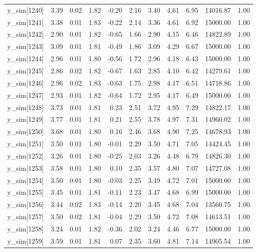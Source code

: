\begin{table}[ht]
\begin{tabular}{rrrrrrrrrrr}
  y\_sim[1240] & 3.39 & 0.02 & 1.82 & -0.20 & 2.16 & 3.40 & 4.61 & 6.95 & 14016.87 & 1.00 \\ 
  y\_sim[1241] & 3.38 & 0.01 & 1.83 & -0.22 & 2.14 & 3.36 & 4.61 & 6.92 & 15000.00 & 1.00 \\ 
  y\_sim[1242] & 2.90 & 0.01 & 1.82 & -0.65 & 1.66 & 2.90 & 4.15 & 6.46 & 14822.89 & 1.00 \\ 
  y\_sim[1243] & 3.09 & 0.01 & 1.81 & -0.49 & 1.86 & 3.09 & 4.29 & 6.67 & 15000.00 & 1.00 \\ 
  y\_sim[1244] & 2.96 & 0.01 & 1.80 & -0.56 & 1.72 & 2.96 & 4.18 & 6.43 & 15000.00 & 1.00 \\ 
  y\_sim[1245] & 2.86 & 0.02 & 1.82 & -0.67 & 1.63 & 2.85 & 4.10 & 6.42 & 14279.61 & 1.00 \\ 
  y\_sim[1246] & 2.96 & 0.02 & 1.83 & -0.63 & 1.75 & 2.98 & 4.17 & 6.51 & 14718.86 & 1.00 \\ 
  y\_sim[1247] & 2.93 & 0.01 & 1.82 & -0.64 & 1.72 & 2.95 & 4.17 & 6.49 & 15000.00 & 1.00 \\ 
  y\_sim[1248] & 3.73 & 0.01 & 1.81 & 0.23 & 2.51 & 3.72 & 4.95 & 7.29 & 14822.17 & 1.00 \\ 
  y\_sim[1249] & 3.77 & 0.01 & 1.81 & 0.21 & 2.55 & 3.78 & 4.97 & 7.31 & 14960.02 & 1.00 \\ 
  y\_sim[1250] & 3.68 & 0.01 & 1.80 & 0.16 & 2.46 & 3.68 & 4.90 & 7.25 & 14678.93 & 1.00 \\ 
  y\_sim[1251] & 3.50 & 0.01 & 1.80 & -0.01 & 2.29 & 3.50 & 4.71 & 7.05 & 14424.45 & 1.00 \\ 
  y\_sim[1252] & 3.26 & 0.01 & 1.80 & -0.25 & 2.03 & 3.26 & 4.48 & 6.79 & 14826.30 & 1.00 \\ 
  y\_sim[1253] & 3.58 & 0.01 & 1.80 & 0.10 & 2.35 & 3.57 & 4.80 & 7.07 & 14727.08 & 1.00 \\ 
  y\_sim[1254] & 3.50 & 0.01 & 1.80 & -0.03 & 2.25 & 3.49 & 4.72 & 7.01 & 15000.00 & 1.00 \\ 
  y\_sim[1255] & 3.45 & 0.01 & 1.81 & -0.11 & 2.23 & 3.47 & 4.68 & 6.99 & 15000.00 & 1.00 \\ 
  y\_sim[1256] & 3.44 & 0.02 & 1.83 & -0.14 & 2.20 & 3.45 & 4.68 & 7.04 & 13560.75 & 1.00 \\ 
  y\_sim[1257] & 3.50 & 0.02 & 1.81 & -0.04 & 2.29 & 3.50 & 4.72 & 7.08 & 14613.51 & 1.00 \\ 
  y\_sim[1258] & 3.24 & 0.01 & 1.82 & -0.36 & 2.02 & 3.24 & 4.46 & 6.77 & 15000.00 & 1.00 \\ 
  y\_sim[1259] & 3.59 & 0.01 & 1.81 & 0.07 & 2.35 & 3.60 & 4.81 & 7.14 & 14905.54 & 1.00 \\ 

\end{tabular}
\end{table}
